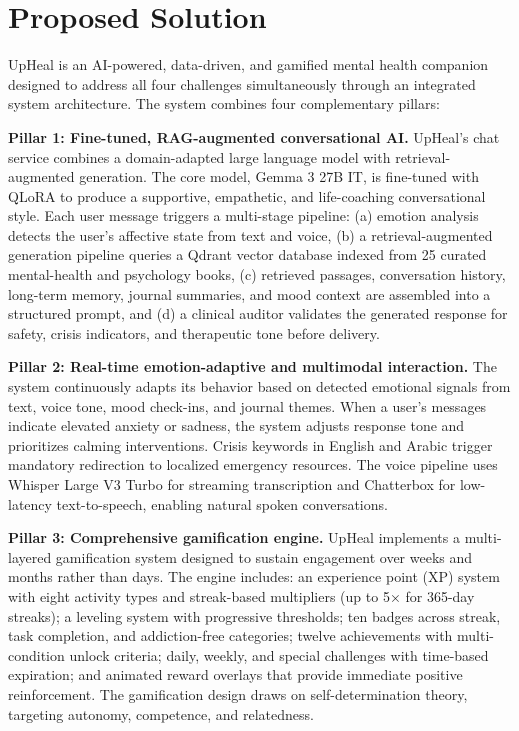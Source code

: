 \documentclass[
  letterpaper,
  12pt,
  a4paper,
  openany]{report}
\begin{document}
\section{Proposed Solution}\label{sec-proposed-solution}

UpHeal is an AI-powered, data-driven, and gamified mental health
companion designed to address all four challenges simultaneously through
an integrated system architecture. The system combines four
complementary pillars:

\textbf{Pillar 1: Fine-tuned, RAG-augmented conversational AI.} UpHeal's
chat service combines a domain-adapted large language model with
retrieval-augmented generation. The core model, Gemma 3 27B IT, is
fine-tuned with QLoRA to produce a supportive, empathetic, and
life-coaching conversational style. Each user message triggers a
multi-stage pipeline: (a) emotion analysis detects the user's affective
state from text and voice, (b) a retrieval-augmented generation pipeline
queries a Qdrant vector database indexed from 25 curated mental-health
and psychology books, (c) retrieved passages, conversation history,
long-term memory, journal summaries, and mood context are assembled into
a structured prompt, and (d) a clinical auditor validates the generated
response for safety, crisis indicators, and therapeutic tone before
delivery.

\textbf{Pillar 2: Real-time emotion-adaptive and multimodal
interaction.} The system continuously adapts its behavior based on
detected emotional signals from text, voice tone, mood check-ins, and
journal themes. When a user's messages indicate elevated anxiety or
sadness, the system adjusts response tone and prioritizes calming
interventions. Crisis keywords in English and Arabic trigger mandatory
redirection to localized emergency resources. The voice pipeline uses
Whisper Large V3 Turbo for streaming transcription and Chatterbox for
low-latency text-to-speech, enabling natural spoken conversations.

\textbf{Pillar 3: Comprehensive gamification engine.} UpHeal implements
a multi-layered gamification system designed to sustain engagement over
weeks and months rather than days. The engine includes: an experience
point (XP) system with eight activity types and streak-based multipliers
(up to 5× for 365-day streaks); a leveling system with progressive
thresholds; ten badges across streak, task completion, and
addiction-free categories; twelve achievements with multi-condition
unlock criteria; daily, weekly, and special challenges with time-based
expiration; and animated reward overlays that provide immediate positive
reinforcement. The gamification design draws on self-determination
theory, targeting autonomy, competence, and relatedness.
\end{document}
